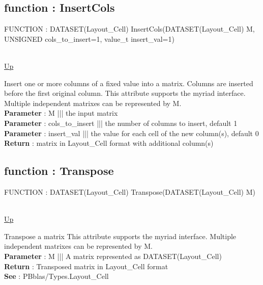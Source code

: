 \subsection*{function : InsertCols}
\hypertarget{ecldoc:pbblas.matutils.insertcols}{FUNCTION : DATASET(Layout\_Cell) InsertCols(DATASET(Layout\_Cell) M, UNSIGNED cols\_to\_insert=1, value\_t insert\_val=1)} \\
\hyperlink{ecldoc:PBblas.MatUtils}{Up} \\
\par
Insert one or more columns of a fixed value into a matrix. Columns are inserted before the first original column. This attribute supports the myriad interface. Multiple independent matrixes can be represented by M. \\
\textbf{Parameter} : M ||| the input matrix \\
\textbf{Parameter} : cols\_to\_insert ||| the number of columns to insert, default 1 \\
\textbf{Parameter} : insert\_val ||| the value for each cell of the new column(s), default 0 \\
\textbf{Return} : matrix in Layout\_Cell format with additional column(s) \\
\subsection*{function : Transpose}
\hypertarget{ecldoc:pbblas.matutils.transpose}{FUNCTION : DATASET(Layout\_Cell) Transpose(DATASET(Layout\_Cell) M)} \\
\hyperlink{ecldoc:PBblas.MatUtils}{Up} \\
\par
Transpose a matrix This attribute supports the myriad interface. Multiple independent matrixes can be represented by M. \\
\textbf{Parameter} : M ||| A matrix represented as DATASET(Layout\_Cell) \\
\textbf{Return} : Transposed matrix in Layout\_Cell format \\
\textbf{See} : PBblas/Types.Layout\_Cell \\

